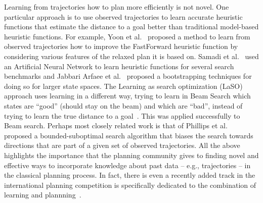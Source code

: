 \documentclass[12pt]{article}
\begin{document}
Learning from trajectories how to plan more efficiently is not novel. 
One particular approach is to use observed trajectories to learn accurate heuristic functions that estimate the distance to a goal better than traditional model-based heuristic functions. For example, Yoon et al.~\cite{yoon2006learning} proposed a method to learn from observed trajectories how to improve the FastForward heuristic function by considering various features of the relaxed plan it is based on. 
Samadi et al.~\cite{samadi2008learning} used an Artificial Neural Network to learn heuristic functions for several search benchmarks and Jabbari Arfaee et al.~\cite{arfaee2011learning} proposed a bootstrapping techniques for doing so for larger state spaces. The Learning as search optimization (LaSO) approach uses learning in a different way, trying to learn in Beam Search which states are ``good'' (should stay on the beam) and which are ``bad'', instead of trying to learn the true distance to a goal~\cite{xu2007discriminative}. This was applied successfully to Beam search. Perhaps most closely related work is that of Phillips et al.~\cite{phillips2012graphs} proposed a bounded-suboptimal search algorithm that biases the search towards directions that are part of a given set of observed trajectories. All the above highlights the importance that the planning community gives to  finding novel and effective ways to incorporate knowledge about past data -- e.g., trajectories -- in the classical planning process. In fact, there is even a recently added track in the international planning competition is specifically dedicated to the combination of learning and plannning~\cite{fern2011first}. 





\end{document}
